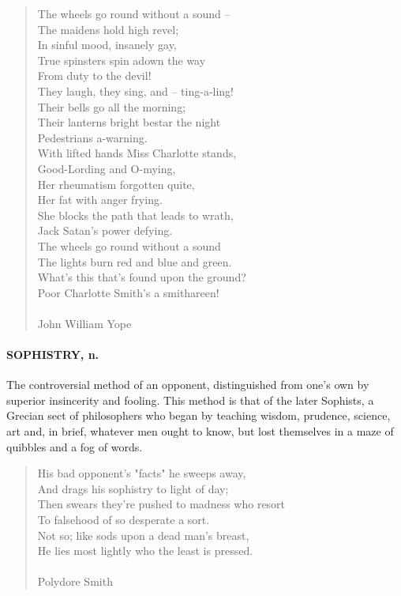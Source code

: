 \documentclass[11pt]{article}
\begin{document}
\begin{quote}   The wheels go round without a sound -- \\
      The maidens hold high revel; \\
  In sinful mood, insanely gay, \\
  True spinsters spin adown the way \\
      From duty to the devil! \\
  They laugh, they sing, and -- ting-a-ling! \\
      Their bells go all the morning; \\
  Their lanterns bright bestar the night \\
      Pedestrians a-warning. \\
  With lifted hands Miss Charlotte stands, \\
      Good-Lording and O-mying, \\
  Her rheumatism forgotten quite, \\
      Her fat with anger frying. \\
  She blocks the path that leads to wrath, \\
      Jack Satan's power defying. \\
  The wheels go round without a sound \\
      The lights burn red and blue and green. \\
  What's this that's found upon the ground? \\
      Poor Charlotte Smith's a smithareen! \\
 \\
John William Yope \end{quote}


\paragraph{SOPHISTRY, n.}  The controversial method of an opponent, distinguished
from one's own by superior insincerity and fooling.  This method is
that of the later Sophists, a Grecian sect of philosophers who began
by teaching wisdom, prudence, science, art and, in brief, whatever men
ought to know, but lost themselves in a maze of quibbles and a fog of
words.

\begin{quote}   His bad opponent's "facts" he sweeps away, \\
  And drags his sophistry to light of day; \\
  Then swears they're pushed to madness who resort \\
  To falsehood of so desperate a sort. \\
  Not so; like sods upon a dead man's breast, \\
  He lies most lightly who the least is pressed. \\
 \\
Polydore Smith \end{quote}
\end{document}

